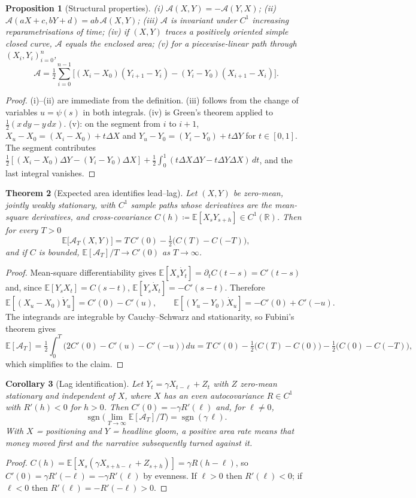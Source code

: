 \documentclass[11pt,a4paper]{article}
\theoremstyle{plain}
\newtheorem{theorem}{Theorem}[section]
\newtheorem{proposition}[theorem]{Proposition}
\newtheorem{corollary}[theorem]{Corollary}
\theoremstyle{definition}
\theoremstyle{remark}
\newcommand{\R}{\mathbb{R}}
\newcommand{\E}{\mathbb{E}}
\DeclareMathOperator{\sgn}{sgn}
\begin{document}
\begin{proposition}[Structural properties]\label{prop:levyprops}
(i) $\mathcal{A}(X,Y)=-\mathcal{A}(Y,X)$; (ii) $\mathcal{A}(aX+c,bY+d)=ab\,\mathcal{A}(X,Y)$; (iii) $\mathcal{A}$ is invariant under $C^1$ increasing reparametrisations of time; (iv) if $(X,Y)$ traces a positively oriented simple closed curve, $\mathcal{A}$ equals the enclosed area; (v) for a piecewise-linear path through $(X_i,Y_i)_{i=0}^n$,
\[
  \mathcal{A}=\tfrac12\sum_{i=0}^{n-1}\big[(X_i-X_0)(Y_{i+1}-Y_i)-(Y_i-Y_0)(X_{i+1}-X_i)\big].
\]
\end{proposition}
\begin{proof}
(i)--(ii) are immediate from the definition. (iii) follows from the change of variables $u=\psi(s)$ in both integrals. (iv) is Green's theorem applied to $\tfrac12(x\,dy-y\,dx)$. (v): on the segment from $i$ to $i+1$, $X_u-X_0=(X_i-X_0)+t\Delta X$ and $Y_u-Y_0=(Y_i-Y_0)+t\Delta Y$ for $t\in[0,1]$. The segment contributes $\tfrac12[(X_i-X_0)\Delta Y-(Y_i-Y_0)\Delta X]+\tfrac12\int_0^1(t\Delta X\Delta Y-t\Delta Y\Delta X)\,dt$, and the last integral vanishes.
\end{proof}

\begin{theorem}[Expected area identifies lead--lag]\label{thm:levy}
Let $(X,Y)$ be zero-mean, jointly weakly stationary, with $C^1$ sample paths whose derivatives are the mean-square derivatives, and cross-covariance $C(h)\coloneqq\E[X_sY_{s+h}]\in C^1(\R)$. Then for every $T>0$
\[
  \E\big[\mathcal{A}_T(X,Y)\big]=T\,C'(0)-\tfrac12\big(C(T)-C(-T)\big),
\]
and if $C$ is bounded, $\E[\mathcal{A}_T]/T\to C'(0)$ as $T\to\infty$.
\end{theorem}
\begin{proof}
Mean-square differentiability gives $\E[X_s\dot Y_t]=\partial_tC(t-s)=C'(t-s)$ and, since $\E[Y_sX_t]=C(s-t)$, $\E[Y_s\dot X_t]=-C'(s-t)$. Therefore
\[
  \E[(X_u-X_0)\dot Y_u]=C'(0)-C'(u),\qquad \E[(Y_u-Y_0)\dot X_u]=-C'(0)+C'(-u).
\]
The integrands are integrable by Cauchy--Schwarz and stationarity, so Fubini's theorem gives
\[
  \E[\mathcal{A}_T]=\tfrac12\int_0^T\big(2C'(0)-C'(u)-C'(-u)\big)\,du=T\,C'(0)-\tfrac12\big(C(T)-C(0)\big)-\tfrac12\big(C(0)-C(-T)\big),
\]
which simplifies to the claim.
\end{proof}

\begin{corollary}[Lag identification]\label{cor:lag}
Let $Y_t=\gamma X_{t-\ell}+Z_t$ with $Z$ zero-mean stationary and independent of $X$, where $X$ has an even autocovariance $R\in C^1$ with $R'(h)<0$ for $h>0$. Then $C'(0)=-\gamma R'(\ell)$ and, for $\ell\neq0$,
\[
  \sgn\Big(\lim_{T\to\infty}\E[\mathcal{A}_T]/T\Big)=\sgn(\gamma\,\ell).
\]
With $X$ = positioning and $Y$ = headline gloom, a positive area rate means that money moved first and the narrative subsequently turned against it.
\end{corollary}
\begin{proof}
$C(h)=\E[X_s(\gamma X_{s+h-\ell}+Z_{s+h})]=\gamma R(h-\ell)$, so $C'(0)=\gamma R'(-\ell)=-\gamma R'(\ell)$ by evenness. If $\ell>0$ then $R'(\ell)<0$; if $\ell<0$ then $R'(\ell)=-R'(-\ell)>0$.
\end{proof}
\end{document}
